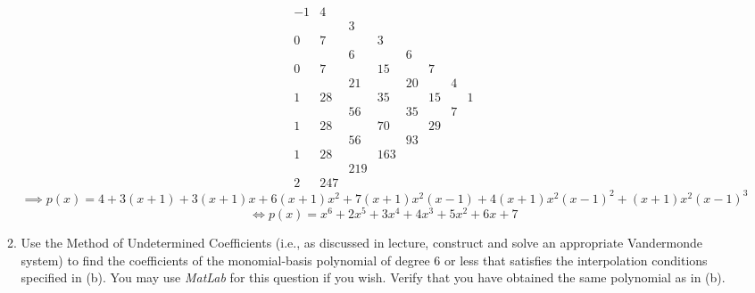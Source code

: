 \documentclass{article}
\begin{document}
\begin{enumerate}
\begin{enumerate}
\[                \]
                \[
                \begin{array}{cccccccc}
                -1  & 4   \\
                    &      & 3          \\
                0   & 7    &             & 3           \\
                    &      & 6           &              & 6          \\
                0   & 7    &             & 15           &             & 7           \\
                    &      & 21          &              & 20          &              & 4            \\
                1   & 28   &             & 35           &             & 15           &               &  1           \\
                    &      & 56          &              & 35          &              & 7            \\
                1   & 28   &             & 70           &             & 29          \\
                    &      & 56          &              & 93         \\
                1   & 28   &             & 163         \\ 
                    &      & 219        \\
                2   & 247  &  
                \end{array}
                \]
            \[ \implies p(x) = 4 + 3(x+1) + 3(x+1)x + 6(x+1)x^2 + 7(x+1)x^2(x-1) + 4(x+1)x^2(x-1)^2 + (x+1)x^2(x-1)^3 \]
            \[ \iff p(x) = x^6 + 2x^5 + 3x^4 + 4x^3 + 5x^2 + 6x + 7 \]
            \item Use the Method of Undetermined Coefficients (i.e., as discussed in lecture, construct and solve an appropriate Vandermonde system) to find the coefficients of the monomial-basis polynomial of degree 6 or less that satisfies the interpolation conditions specified in (b).
                You may use \textit{MatLab} for this question if you wish. Verify that you have obtained the same polynomial as in (b).

\end{enumerate}
\end{enumerate}
\end{document}
